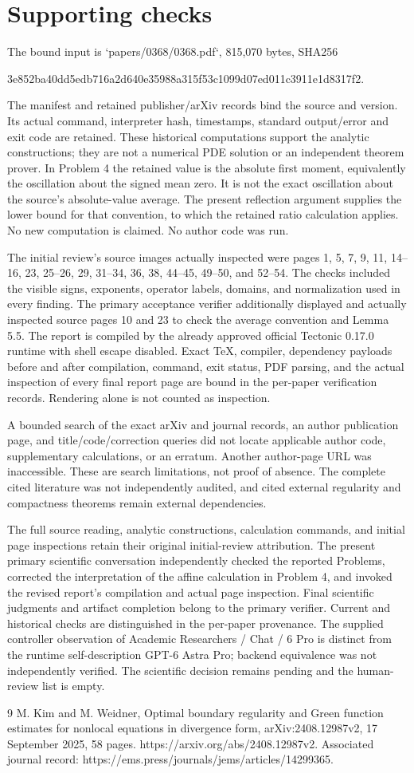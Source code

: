 \documentclass[10pt]{article}
\begin{document}
\section*{Supporting checks}
The bound input is `papers/0368/0368.pdf`, 815,070 bytes, SHA256\par
3e852ba40dd5edb716a2d640e35988a315f53c1099d07ed011c3911e1d8317f2.\par
The manifest and retained publisher/arXiv records bind the source and version. Its actual command, interpreter hash, timestamps, standard output/error and exit code are retained. These historical computations support the analytic constructions; they are not a numerical PDE solution or an independent theorem prover. In Problem 4 the retained value is the absolute first moment, equivalently the oscillation about the signed mean zero. It is not the exact oscillation about the source’s absolute-value average. The present reflection argument supplies the lower bound for that convention, to which the retained ratio calculation applies. No new computation is claimed. No author code was run.\par
The initial review’s source images actually inspected were pages 1, 5, 7, 9, 11, 14–16, 23, 25–26, 29, 31–34, 36, 38, 44–45, 49–50, and 52–54. The checks included the visible signs, exponents, operator labels, domains, and normalization used in every finding. The primary acceptance verifier additionally displayed and actually inspected source pages 10 and 23 to check the average convention and Lemma 5.5. The report is compiled by the already approved official Tectonic 0.17.0 runtime with shell escape disabled. Exact TeX, compiler, dependency payloads before and after compilation, command, exit status, PDF parsing, and the actual inspection of every final report page are bound in the per-paper verification records. Rendering alone is not counted as inspection.\par
A bounded search of the exact arXiv and journal records, an author publication page, and title/code/correction queries did not locate applicable author code, supplementary calculations, or an erratum. Another author-page URL was inaccessible. These are search limitations, not proof of absence. The complete cited literature was not independently audited, and cited external regularity and compactness theorems remain external dependencies.\par
The full source reading, analytic constructions, calculation commands, and initial page inspections retain their original initial-review attribution. The present primary scientific conversation independently checked the reported Problems, corrected the interpretation of the affine calculation in Problem 4, and invoked the revised report’s compilation and actual page inspection. Final scientific judgments and artifact completion belong to the primary verifier. Current and historical checks are distinguished in the per-paper provenance. The supplied controller observation of Academic Researchers / Chat / 6 Pro is distinct from the runtime self-description GPT-6 Astra Pro; backend equivalence was not independently verified. The scientific decision remains pending and the human-review list is empty.\par
9 M. Kim and M. Weidner, Optimal boundary regularity and Green function estimates for nonlocal equations in divergence form, arXiv:2408.12987v2, 17 September 2025, 58 pages. https://arxiv.org/abs/2408.12987v2. Associated journal record: https://ems.press/journals/jems/articles/14299365.\par
\end{document}
